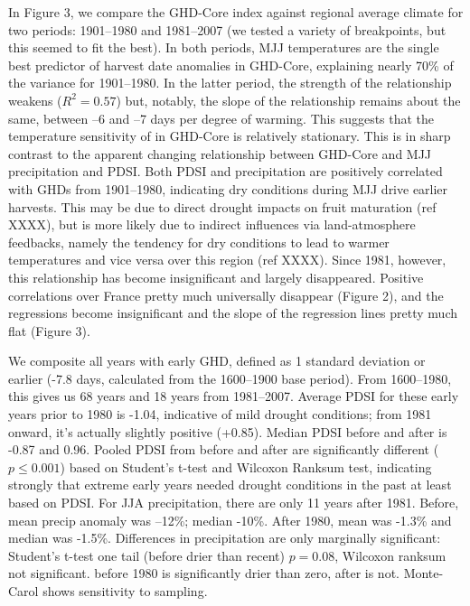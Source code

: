 \documentclass[final]{nature}
\begin{document}
\indent In Figure 3, we compare the GHD-Core index against regional average climate for two periods: 1901--1980 and 1981--2007 (we tested a variety of breakpoints, but this seemed to fit the best). In both periods, MJJ temperatures are the single best predictor of harvest date anomalies in GHD-Core, explaining nearly 70\% of the variance for 1901--1980. In the latter period, the strength of the relationship weakens ($R^2=0.57$) but, notably, the slope of the relationship remains about the same, between --6 and --7 days per degree of warming. This suggests that the temperature sensitivity of in GHD-Core is relatively stationary. This is in sharp contrast to the apparent changing relationship between GHD-Core and MJJ precipitation and PDSI. Both PDSI and precipitation are positively correlated with GHDs from 1901--1980, indicating dry conditions during MJJ drive earlier harvests. This may be due to direct drought impacts on fruit maturation (ref XXXX), but is more likely due to indirect influences via land-atmosphere feedbacks, namely the tendency for dry conditions to lead to warmer temperatures and vice versa over this region (ref XXXX). Since 1981, however, this relationship has become insignificant and largely disappeared. Positive correlations over France pretty much universally disappear (Figure 2), and the regressions become insignificant and the slope of the regression lines pretty much flat (Figure 3). 



\indent We composite all years with early GHD, defined as 1 standard deviation or earlier (-7.8 days, calculated from the 1600--1900 base period). From 1600--1980, this gives us 68 years and 18 years from 1981--2007. Average PDSI for these early years prior to 1980 is -1.04, indicative of mild drought conditions; from 1981 onward, it's actually slightly positive (+0.85). Median PDSI before and after is -0.87 and 0.96. Pooled PDSI from before and after are significantly different ($p\le0.001$) based on Student's t-test and Wilcoxon Ranksum test, indicating strongly that extreme early years needed drought conditions in the past at least based on PDSI. For JJA precipitation, there are only 11 years after 1981. Before, mean precip anomaly was --12\%; median -10\%. After 1980, mean was -1.3\% and median was -1.5\%. Differences in precipitation are only marginally significant: Student's t-test one tail (before drier than recent) $p=0.08$, Wilcoxon ranksum not significant. before 1980 is significantly drier than zero, after is not. Monte-Carol shows sensitivity to sampling.\\
\indent 
\end{document}
